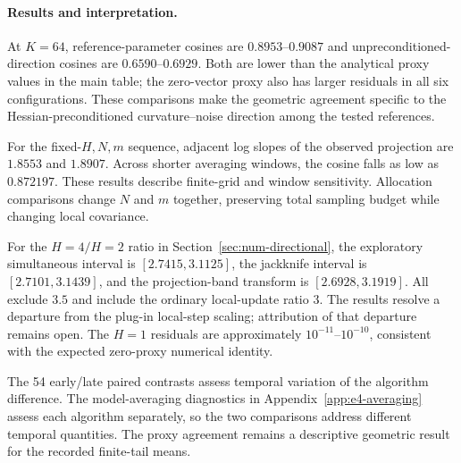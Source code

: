 \paragraph{Results and interpretation.}
At $K=64$, reference-parameter cosines are $0.8953$--$0.9087$ and
unpreconditioned-direction cosines are $0.6590$--$0.6929$.
Both are lower than the analytical proxy values in the main table; the
zero-vector proxy also has larger residuals in all six configurations.
These comparisons make the geometric agreement specific to the
Hessian-preconditioned curvature--noise direction among the tested references.

For the fixed-$H,N,m$ sequence, adjacent log slopes of the observed
projection are $1.8553$ and $1.8907$. Across shorter averaging windows,
the cosine falls as low as $0.872197$. These results describe finite-grid
and window sensitivity. Allocation comparisons change $N$ and $m$
together, preserving total sampling budget while changing local covariance.

For the $H=4/H=2$ ratio in Section~\ref{sec:num-directional}, the
exploratory simultaneous interval is $[2.7415,3.1125]$, the jackknife
interval is $[2.7101,3.1439]$, and the projection-band transform is
$[2.6928,3.1919]$. All exclude $3.5$ and include the ordinary local-update
ratio $3$. The results resolve a departure from the plug-in local-step
scaling; attribution of that departure remains open. The $H=1$ residuals
are approximately $10^{-11}$--$10^{-10}$, consistent with the expected
zero-proxy numerical identity.

The 54 early/late paired contrasts assess temporal variation of the
algorithm difference. The model-averaging diagnostics in
Appendix~\ref{app:e4-averaging} assess each algorithm separately, so
the two comparisons address different temporal quantities. The proxy
agreement remains a descriptive geometric result for the recorded
finite-tail means.
